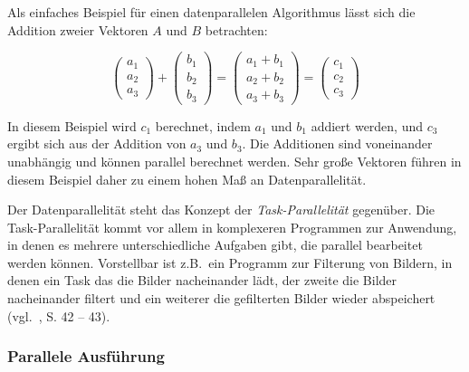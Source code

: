 Als einfaches Beispiel für einen datenparallelen Algorithmus lässt sich die Addition zweier Vektoren $A$ und $B$
betrachten:

\begin{equation*}
    \left(
        \begin{array}{c}
            a_1\\
            a_2\\
            a_3
        \end{array}
    \right)
    +
    \left(
        \begin{array}{c}
            b_1\\
            b_2\\
            b_3
        \end{array}
    \right)
    =
    \left(
        \begin{array}{c}
            a_1 + b_1 \\
            a_2 + b_2 \\
            a_3 + b_3
        \end{array}
    \right)
    =
    \left(
        \begin{array}{c}
            c_1 \\
            c_2 \\
            c_3
        \end{array}
    \right)
\end{equation*}

In diesem Beispiel wird $c_1$ berechnet, indem $a_1$ und $b_1$ addiert werden, und $c_3$ ergibt sich aus der Addition
von $a_3$ und $b_3$. Die Additionen sind voneinander unabhängig und können parallel berechnet werden. Sehr große
Vektoren führen in diesem Beispiel daher zu einem hohen Maß an Datenparallelität.

Der Datenparallelität steht das Konzept der \textit{Task-Parallelität} gegenüber. Die Task-Parallelität kommt vor allem
in komplexeren Programmen zur Anwendung, in denen es mehrere unterschiedliche Aufgaben gibt, die parallel bearbeitet
werden können. Vorstellbar ist z.B.\ ein Programm zur Filterung von Bildern, in denen ein Task das die Bilder
nacheinander lädt, der zweite die Bilder nacheinander filtert und ein weiterer die gefilterten Bilder wieder
abspeichert (vgl.~\cite{kirkhwu}, S. 42 -- 43).

\subsubsection*{Parallele Ausführung}

